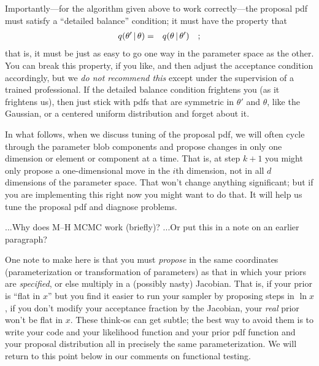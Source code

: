 \documentclass[12pt,twoside,pdftex]{article}
\newcommand{\pars}{\theta}
\begin{document}
Importantly---for the algorithm given above to work correctly---the
  proposal pdf must satisfy a ``detailed balance'' condition; it
  must have the property that
\begin{eqnarray}
q(\pars'\given\pars) &=& q(\pars\given\pars')
\quad ;
\end{eqnarray}
that is, it must be just as easy to go one way in the parameter space
  as the other.
You can break this property, if you like, and then adjust the
  acceptance condition accordingly, but we \emph{do not recommend this}
  except under the supervision of a trained professional.
If the detailed balance condition frightens you (as it frightens us),
  then just stick with pdfs that are symmetric in $\pars'$ and $\pars$,
  like the Gaussian, or a centered uniform distribution and forget about
  it.

In what follows, when we discuss tuning of the proposal pdf, we will
  often cycle through the parameter blob components and propose changes
  in only one dimension or element or component at a time.
That is, at step $k+1$ you might only propose a one-dimensional move
  in the $i$th dimension, not in all $d$ dimensions of the parameter
  space.
That won't change anything significant; but if you are implementing
  this right now you might want to do that.
It will help us tune the proposal pdf and diagnose problems.

...Why does M--H MCMC work (briefly)? ...Or put this in a note on an earlier paragraph?

One note to make here
  is that you must \emph{propose}
  in the same coordinates (parameterization or transformation of parameters)
  as that in which your priors are \emph{specified},
  or else multiply in a (possibly nasty) Jacobian.
That is, if your prior is ``flat in $x$''
  but you find it easier to run your sampler by proposing steps in $\ln x$,
  if you don't modify your acceptance fraction by the Jacobian,
  your \emph{real} prior won't be flat in $x$.
These think-os can get subtle;
  the best way to avoid them
  is to write your code and your likelihood function
  and your prior pdf function and your proposal distribution
  all in precisely the same parameterization.
We will return to this point below in our comments on functional testing.
\end{document}

